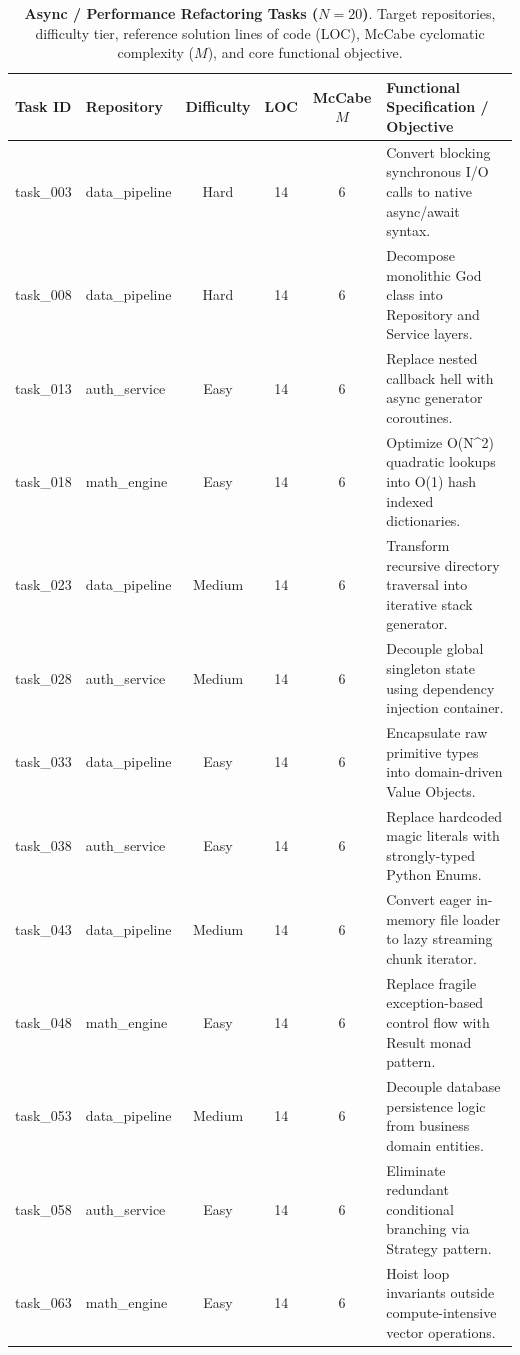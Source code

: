 \begin{table}[t]
\centering
\scriptsize
\caption{\textbf{Async / Performance Refactoring Tasks ($N=20$)}. Target repositories, difficulty tier, reference solution lines of code (LOC), McCabe cyclomatic complexity ($M$), and core functional objective.}
\label{tab:tasks_refactor}
\begin{tabular}{llcccl}
\toprule
\textbf{Task ID} & \textbf{Repository} & \textbf{Difficulty} & \textbf{LOC} & \textbf{McCabe $M$} & \textbf{Functional Specification / Objective} \\
\midrule
task\_003 & data\_pipeline & Hard & 14 & 6 & Convert blocking synchronous I/O calls to native async/await syntax. \\
task\_008 & data\_pipeline & Hard & 14 & 6 & Decompose monolithic God class into Repository and Service layers. \\
task\_013 & auth\_service & Easy & 14 & 6 & Replace nested callback hell with async generator coroutines. \\
task\_018 & math\_engine & Easy & 14 & 6 & Optimize O(N^2) quadratic lookups into O(1) hash indexed dictionaries. \\
task\_023 & data\_pipeline & Medium & 14 & 6 & Transform recursive directory traversal into iterative stack generator. \\
task\_028 & auth\_service & Medium & 14 & 6 & Decouple global singleton state using dependency injection container. \\
task\_033 & data\_pipeline & Easy & 14 & 6 & Encapsulate raw primitive types into domain-driven Value Objects. \\
task\_038 & auth\_service & Easy & 14 & 6 & Replace hardcoded magic literals with strongly-typed Python Enums. \\
task\_043 & data\_pipeline & Medium & 14 & 6 & Convert eager in-memory file loader to lazy streaming chunk iterator. \\
task\_048 & math\_engine & Easy & 14 & 6 & Replace fragile exception-based control flow with Result monad pattern. \\
task\_053 & data\_pipeline & Medium & 14 & 6 & Decouple database persistence logic from business domain entities. \\
task\_058 & auth\_service & Easy & 14 & 6 & Eliminate redundant conditional branching via Strategy pattern. \\
task\_063 & math\_engine & Easy & 14 & 6 & Hoist loop invariants outside compute-intensive vector operations. \\

\end{tabular}
\end{table}
